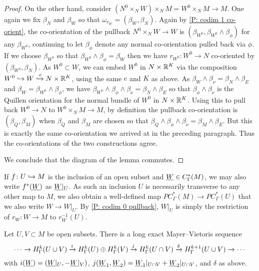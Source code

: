 \begin{proof}
	On the other hand, consider $(N^0 \times_N W) \times_N M = W^0 \times_N M \to M$.
	One again we fix $\beta_N$ and $\beta_W$ so that $\omega_{r_W} = (\beta_W,\beta_N)$.
	Again by \cref{P: codim 1 co-orient}, the co-orientation of the pullback $N^0 \times_N W \to W$ is $(\beta_{W^0},\beta_{W^0} \wedge \beta_\phi)$ for any $\beta_{W^0}$, continuing to let $\beta_\phi$ denote any normal co-orientation pulled back via $\phi$.
	If we choose $\beta_{W^0}$ so that $\beta_{W^0} \wedge \beta_\phi = \beta_W$ then we have $r_{W^0} \colon W^0 \to N$ co-oriented by $(\beta_{W^0},\beta_N)$.
	As $W^0 \subset W$, we can embed $W^0$ in $N \times \mathbb{R}^K$ via the composition $W^0 \hookrightarrow W \xhookrightarrow{e}N \times \mathbb{R}^K$, using the same $e$ and $K$ as above.
	As $\beta_W \wedge \beta_\nu = \beta_N \wedge \beta_E$ and $\beta_W = \beta_{W^0} \wedge \beta_\phi$, we have $\beta_{W^0} \wedge \beta_\phi \wedge \beta_\nu = \beta_N \wedge \beta_E$ so that $\beta_\phi \wedge \beta_\nu$ is the Quillen orientation for the normal bundle of $W^0$ in $N \times \mathbb{R}^K$.
	Using this to pull back $W^0 \to N$ to $W^0 \times_N M \to M$, by definition the pullback co-orientation is $(\beta_Q,\beta_M)$ when $\beta_Q$ and $\beta_M$ are chosen so that $\beta_Q \wedge \beta_\phi \wedge \beta_\nu = \beta_M \wedge \beta_E$.
	But this is exactly the same co-orientation we arrived at in the preceding paragraph.
	Thus the co-orientations of the two constructions agree.

	We conclude that the diagram of the lemma commutes.
\end{proof}

\begin{notation}
	If $f \colon U \hookrightarrow M$ is the inclusion of an open subset and $\underline{W} \in C^*_\Gamma(M)$, we may also write $f^*(\underline{W})$ as $\underline{W}|_U$.
	As such an inclusion $U$ is necessarily transverse to any other map to $M$, we also obtain a well-defined map $PC^*_\Gamma(M) \to PC^*_\Gamma(U)$ that we also write $W \to W|_U$.
	By \cref{P: codim 0 pullback}, $W|_U$ is simply the restriction of $r_W \colon W \to M$ to $r_W^{-1}(U)$.
\end{notation}

\begin{theorem}\label{T: absolute MV}
	Let $U,V \subset M$ be open subsets.
	There is a long exact Mayer--Vietoris sequence
	$$\cdots \to H^k_\Gamma(U \cup V) \xrightarrow{i} H^k_\Gamma(U) \oplus H^k_\Gamma(V) \xrightarrow{j} H^k_\Gamma(U \cap V) \xrightarrow{\delta} H^{k+1}_\Gamma(U \cup V)\to\cdots$$
	with $i(\underline{W}) = (\underline{W}|_U, -\underline{W}|_V)$, $j(\underline{W}_1,\underline{W}_2) = \underline{W}_1|_{U \cap V}+\underline{W}_2|_{U \cap V}$, and $\delta$ as above.
\end{theorem}

